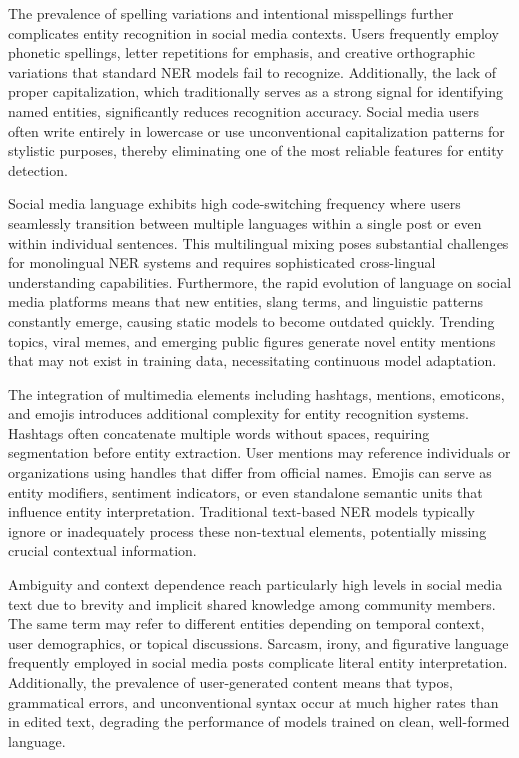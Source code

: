 \documentclass[12pt,a4paper]{report}
\begin{document}
The prevalence of spelling variations and intentional misspellings further complicates entity recognition in social media contexts. Users frequently employ phonetic spellings, letter repetitions for emphasis, and creative orthographic variations that standard NER models fail to recognize. Additionally, the lack of proper capitalization, which traditionally serves as a strong signal for identifying named entities, significantly reduces recognition accuracy. Social media users often write entirely in lowercase or use unconventional capitalization patterns for stylistic purposes, thereby eliminating one of the most reliable features for entity detection.

Social media language exhibits high code-switching frequency where users seamlessly transition between multiple languages within a single post or even within individual sentences. This multilingual mixing poses substantial challenges for monolingual NER systems and requires sophisticated cross-lingual understanding capabilities. Furthermore, the rapid evolution of language on social media platforms means that new entities, slang terms, and linguistic patterns constantly emerge, causing static models to become outdated quickly. Trending topics, viral memes, and emerging public figures generate novel entity mentions that may not exist in training data, necessitating continuous model adaptation.

The integration of multimedia elements including hashtags, mentions, emoticons, and emojis introduces additional complexity for entity recognition systems. Hashtags often concatenate multiple words without spaces, requiring segmentation before entity extraction. User mentions may reference individuals or organizations using handles that differ from official names. Emojis can serve as entity modifiers, sentiment indicators, or even standalone semantic units that influence entity interpretation. Traditional text-based NER models typically ignore or inadequately process these non-textual elements, potentially missing crucial contextual information.

Ambiguity and context dependence reach particularly high levels in social media text due to brevity and implicit shared knowledge among community members. The same term may refer to different entities depending on temporal context, user demographics, or topical discussions. Sarcasm, irony, and figurative language frequently employed in social media posts complicate literal entity interpretation. Additionally, the prevalence of user-generated content means that typos, grammatical errors, and unconventional syntax occur at much higher rates than in edited text, degrading the performance of models trained on clean, well-formed language.
\end{document}
